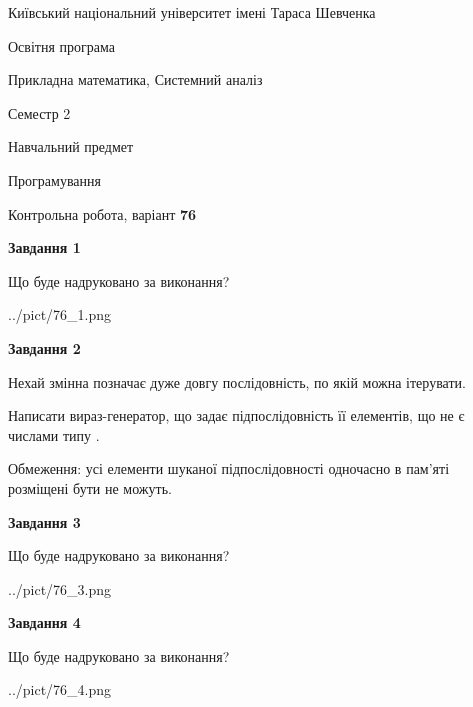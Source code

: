 \documentclass[12pt, ukrainian]{article}
\begin{document}
{{\begin {small}\par
{ \center  Київський національний університет імені Тараса Шевченка \par}
{\parbox {5 cm}{Освітня програма \hfill}{\parbox {8 cm}{Прикладна математика, Системний аналіз \hfill}}\parbox {5 cm}{\hfill Семестр 2}}\par
{\parbox {5 cm} {Навчальний предмет \hfill}\parbox {7 cm}{Програмування \hfill}\parbox {6cm}{\hfill}\par}\vspace{-7pt} \end{small}}{\center Контрольна робота, варіант  \No \textbf
{ 76 }\par}}
{
\begin {large}
{\begin {center}\textbf{Завдання 1}\end {center}}\par
Що буде надруковано за виконання?\par\par
\begin{center}
	{../pict/76_1.png}
\end{center}
\newpage

{\begin {center}\textbf{Завдання 2}\end {center}}\par
Нехай змінна  позначає дуже довгу послідовність, по якій можна ітерувати.

Написати вираз-генератор, що задає підпослідовність її елементів, що не є числами типу .

Обмеження: усі елементи шуканої підпослідовності одночасно в пам'яті розміщені бути не можуть.\par
\newpage

{\begin {center}\textbf{Завдання 3}\end {center}}\par
Що буде надруковано за виконання?
\begin{center}
	{../pict/76_3.png}
\end{center}
\newpage

{\begin {center}\textbf{Завдання 4}\end {center}}\par
Що буде надруковано за виконання?\par
\begin{center}
	{../pict/76_4.png}
\end{center}
\newpage


\end{large}}
\end{document}
